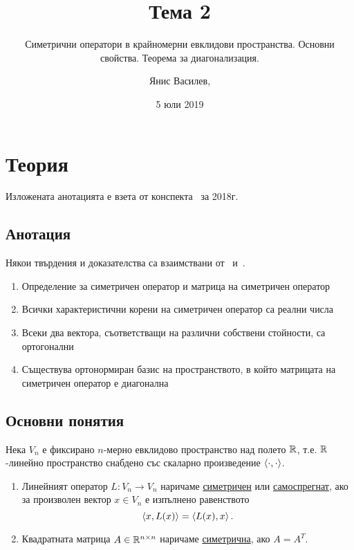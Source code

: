 \documentclass[numbers=endperiod, DIV=15, bibliography=totocnumbered]{scrartcl}
\title{Тема 2}
\subtitle{Симетрични оператори в крайномерни евклидови пространства. Основни свойства. Теорема за диагонализация.}
\author{Янис Василев, \Email{ianis@ivasilev.net}}
\date{5 юли 2019}
\begin{document}
\maketitle

\section{Теория}

Изложената анотацията е взета от конспекта~\cite{Syllabus} за 2018г.

\subsection{Анотация}

Някои твърдения и доказателства са взаимствани от~\cite{Knapp} и~\cite{RoyachkiNotes}.

\begin{enumerate}
  \item Определение за симетричен оператор и матрица на симетричен оператор
  \item Всички характеристични корени на симетричен оператор са реални числа
  \item Всеки два вектора, съответстващи на различни собствени стойности, са ортогонални
  \item Съществува ортонормиран базис на пространството, в който матрицата на симетричен оператор е диагонална
\end{enumerate}

\subsection{Основни понятия}

Нека $V_n$ е фиксирано $n$-мерно евклидово пространство над полето $\mathbb{R}$, т.е. $\mathbb{R}$-линейно пространство снабдено със скаларно произведение $\left\langle \cdot, \cdot \right\rangle$.

\begin{definition}
  \mbox{}
  \begin{enumerate}
    \item Линейният оператор $L: V_n \to V_n$ наричаме \uline{симетричен} или \uline{самоспрегнат}, ако за произволен вектор $x \in V_n$ е изпълнено равенството
    \begin{displaymath}
      \left\langle x, L(x) \right\rangle = \left\langle L(x), x \right\rangle.
    \end{displaymath}

    \item Квадратната матрица $A \in \mathbb{R}^{n \times n}$ наричаме \uline{симетрична}, ако $A = A^T$.
  \end{enumerate}
\end{definition}
\end{document}
